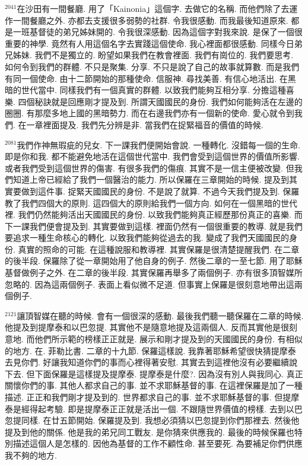 \documentclass{book}
\begin{document}
$^{2041}$在沙田有一間餐廳.
用了「Kainonia」這個字.
去做它的名稱.
而他們除了去運作一間餐廳之外.
亦都去支援很多弱勢的社群.
令我很感動.
而我最後知道原來.
都是一班基督徒的弟兄姊妹開的.
令我很深感動.
因為這個字對我來說.
是保了一個很重要的神學.
竟然有人用這個名字去實踐這個使命.
我心裡面都很感動.
同樣今日弟兄姊妹.
我們不是獨立的.
盼望如果我們在教會裡面.
我們有崗位的.
我們要思考.
如何令到我們的群體.
不只是聚集.
分享.
不只是說了自己的故事就算數.
而是我們有同一個使命.
由十二節開始的那種使命.
信服神.
尋找美善.
有信心地活出.
在黑暗的世代當中.
同樣我們有一個真實的群體.
以致我們能夠互相分享.
分擔這種喜樂.
四個秘訣就是回應剛才提及到.
所謂天國國民的身份.
我們如何能夠活在左邊的圈圈.
有那麼多地上國的黑暗勢力.
而在右邊我們亦有一個新的使命.
愛心就令到我們.
在一章裡面提及.
我們先分辨是非.
當我們在捉緊福音的價值的時候.

$^{2081}$我們作神無瑕疵的兒女.
下一課我們便開始會說.
一種轉化.
沒錯每一個的生命.
即是你和我.
都不能避免地活在這個世代當中.
我們會受到這個世界的價值所影響.
或者我們受到這個世界的傷害.
有很多我們的傷痕.
其實不是一信主便被改變.
但我們知道上帝已經給了我們一個醫治的能力.
所以保羅在三章開始的時候.
提及到其實要做到這件事.
捉緊天國國民的身份.
不是說了就算.
不過今天我們提及到.
保羅教了我們四個大的原則.
這四個大的原則給我們一個方向.
如何在一個黑暗的世代裡.
我們仍然能夠活出天國國民的身份.
以致我們能夠真正經歷那份真正的喜樂.
而下一課我們便會提及到.
其實要做到這樣.
裡面仍然有一個很重要的教導.
就是我們要追求一種生命核心的轉化.
以致我們能夠從過去的我.
變成了我們天國國民的身份.
真實的照命的可能.
在這種說服和教導裡.
其實保羅是很清楚提醒我們.
在二章的後半段.
保羅除了從一章開始用了他自身的例子.
然後二章的一至七節.
用了耶穌基督做例子之外.
在二章的後半段.
其實保羅再舉多了兩個例子.
亦有很多頂智媒所忽略的.
因為這兩個例子.
表面上看似微不足道.
但事實上保羅是很刻意地帶出這兩個例子.

$^{2121}$讓頂智媒在聽的時候.
會有一個很深的感動.
最後我們聽一聽保羅在二章的時候.
他提及到提摩泰和以巴忽提.
其實他不是隨意地提及這兩個人.
反而其實他是很刻意地.
而他們所示範的榜樣正正就是.
展示和剛才提及到的天國國民的身份.
有相似的地方.
在.
菲勒比書.
二章的十九節.
保羅這樣說.
我靠著耶穌希望很快猜提摩泰去見你們.
好讓我知道你們的事而心裡得著安慰.
其實去到這裡他沒有必要繼續說下去.
但下面保羅是這樣提及提摩泰.
提摩泰是什麼?.
因為沒有別人與我同心.
真正關懷你們的事.
其他人都求自己的事.
並不求耶穌基督的事.
在這裡保羅是加了一種描述.
正正和我們剛才提及到的.
世界都求自己的事.
並不求耶穌基督的事.
但提摩泰是經得起考驗.
即是提摩泰正正就是活出一個.
不跟隨世界價值的榜樣.
去到以巴忽提同樣.
在廿五節開始.
保羅提及到.
我想必須猜以巴忽提到你們那裡去.
然後他提及到他的關係.
他是我的弟兄同工戰友.
是你猜來供應我的.
最後的時候保羅也特別描述這個人是怎樣的.
因他為基督的工作不顧性命.
甚至要死.
為要補足你們供應我不夠的地方.
\end{document}
